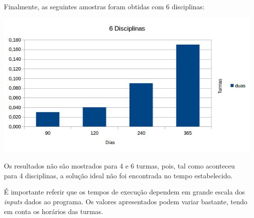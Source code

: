 \documentclass{llncs}
\begin{document}
\newpage
Finalmente, as seguintes amostras foram obtidas com 6 disciplinas:

\includegraphics[scale=0.85]{images/chart3.jpg}

Os resultados não são mostrados para 4 e 6 turmas, pois, tal como aconteceu para 4 disciplinas, a solução ideal não foi encontrada no tempo estabelecido.\par

É importante referir que os tempos de execução dependem em grande escala dos \textit{inputs} dados ao programa. Os valores apresentados podem variar bastante, tendo em conta os horários das turmas.
\end{document}
